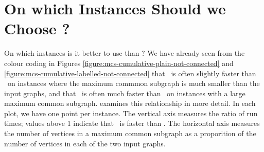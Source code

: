 \section{On which Instances Should we Choose \McSplit{$\downarrow$}?}\label{sec:which-mcsplit-down}

On which instances is it better to use \McSplit{$\downarrow$} than \McSplit?
We have already seen from the colour coding in Figures
\ref{figure:mcs-cumulative-plain-not-connected} and
\ref{figure:mcs-cumulative-labelled-not-connected}
that \McSplit\ is often slightly faster than \McSplitDown\ on instances where
the maximum commmon subgraph is much smaller than the input graphs, and that
\McSplitDown\ is often much faster than \McSplit\ on instances with a large
maximum common subgraph.  
examines this relationship in more detail.  In each plot, we have one
point per instance.  The vertical axis measures the ratio of run times;
values above 1 indicate that \McSplitDown\ is faster than \McSplit.
The horizontal axis measures the number of vertices in a maximum
common subgraph as a proporition of the number of vertices in each
of the two input graphs.

